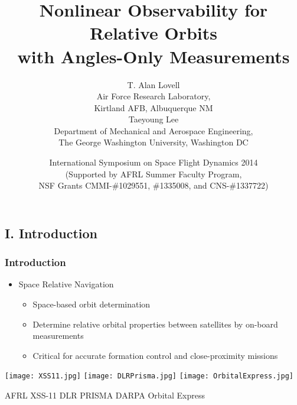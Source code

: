 \documentclass[hyperref={pdftex,pdfpagemode=none,pdfstartview=FitH},10pt]{beamer}
\title[Nonlinear Observability for Relative Orbits]
{Nonlinear Observability for Relative Orbits\\ with Angles-Only Measurements}
\author{T. Alan Lovell\\
{\footnotesize\selectfont Air Force Research Laboratory,\\ Kirtland AFB, Albuquerque NM}\\$ $\\
Taeyoung Lee\\
{\footnotesize\selectfont Department of Mechanical and Aerospace Engineering,\\
The George Washington University, Washington DC}
}
\date{International Symposium on Space Flight Dynamics 2014\vspace*{0.1cm}\\
\footnotesize\selectfont (Supported by AFRL Summer Faculty Program,\\ NSF Grants CMMI-\#1029551, \#1335008, and CNS-\#1337722)}
\begin{document}
\begin{frame}
  \titlepage
\end{frame}


\section*{}
\subsection*{I. Introduction}


\begin{frame}
\frametitle{Introduction}
\begin{itemize}
\item Space Relative Navigation
	\begin{itemize}
	\item Space-based orbit determination
	\item Determine relative orbital properties between satellites by on-board measurements
	\item Critical for accurate formation control and close-proximity missions\\
	\end{itemize}
\end{itemize}

\vfill
\centerline{
\texttt{[image: XSS11.jpg]}\hspace*{0.2cm}
\texttt{[image: DLRPrisma.jpg]}\hspace*{0.2cm}
\texttt{[image: OrbitalExpress.jpg]}}
\centerline{\scriptsize\selectfont
AFRL XSS-11\hspace*{1.5cm} DLR PRISMA\hspace*{1.5cm} DARPA Orbital Express}
\end{frame}
\end{document}
